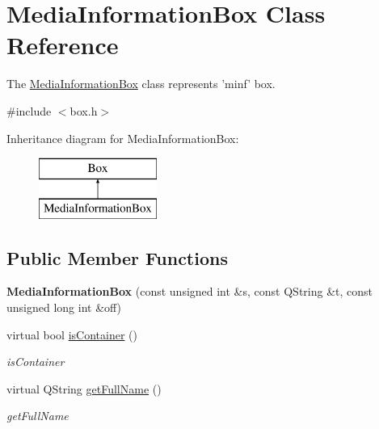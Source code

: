 \hypertarget{class_media_information_box}{\section{Media\-Information\-Box Class Reference}
\label{class_media_information_box}
}


The \hyperlink{class_media_information_box}{Media\-Information\-Box} class represents 'minf' box.  




{\ttfamily \#include $<$box.\-h$>$}

Inheritance diagram for Media\-Information\-Box\-:\begin{figure}[H]
\begin{center}
\leavevmode
\includegraphics[height=2.000000cm]{class_media_information_box}
\end{center}
\end{figure}
\subsection*{Public Member Functions}
\begin{DoxyCompactItemize}
\item 
\hypertarget{class_media_information_box_aae1a46b311b6d40b5d1904230af28ab1}{{\bfseries Media\-Information\-Box} (const unsigned int \&s, const Q\-String \&t, const unsigned long int \&off)}\label{class_media_information_box_aae1a46b311b6d40b5d1904230af28ab1}

\item 
virtual bool \hyperlink{class_media_information_box_a5228b61c1967efca5ab2a1212872765a}{is\-Container} ()
\begin{DoxyCompactList}\small\item\em is\-Container \end{DoxyCompactList}\item 
virtual Q\-String \hyperlink{class_media_information_box_afa6c5040aa7d1533543100c0fbbc0e9d}{get\-Full\-Name} ()
\begin{DoxyCompactList}\small\item\em get\-Full\-Name \end{DoxyCompactList}\end{DoxyCompactItemize}
